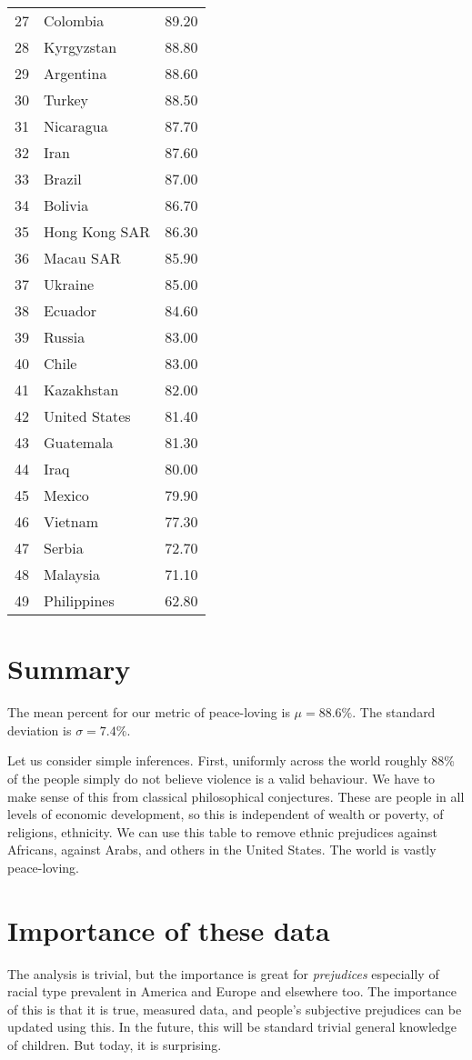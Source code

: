 \documentclass{amsart}
\begin{document}
\begin{longtable}{rlr}
  27 & Colombia & 89.20 \\ 
  28 & Kyrgyzstan & 88.80 \\ 
  29 & Argentina & 88.60 \\ 
  30 & Turkey & 88.50 \\ 
  31 & Nicaragua & 87.70 \\ 
  32 & Iran & 87.60 \\ 
  33 & Brazil & 87.00 \\ 
  34 & Bolivia & 86.70 \\ 
  35 & Hong Kong SAR & 86.30 \\ 
  36 & Macau SAR & 85.90 \\ 
  37 & Ukraine & 85.00 \\ 
  38 & Ecuador & 84.60 \\ 
  39 & Russia & 83.00 \\ 
  40 & Chile & 83.00 \\ 
  41 & Kazakhstan & 82.00 \\ 
  42 & United States & 81.40 \\ 
  43 & Guatemala & 81.30 \\ 
  44 & Iraq & 80.00 \\ 
  45 & Mexico & 79.90 \\ 
  46 & Vietnam & 77.30 \\ 
  47 & Serbia & 72.70 \\ 
  48 & Malaysia & 71.10 \\ 
  49 & Philippines & 62.80 \\ 
   \hline
\hline
\end{longtable}

\section{Summary}

The mean percent for our metric of peace-loving is $\mu = 88.6\%$.  The standard deviation is $\sigma = 7.4\%$.  

Let us consider simple inferences.  First, uniformly across the world roughly 88\% of the people simply do not believe violence is a valid behaviour.  We have to make sense of this from classical philosophical conjectures.  These are people in all levels of economic development, so this is independent of wealth or poverty, of religions, ethnicity.  We can use this table to remove ethnic prejudices against Africans, against Arabs, and others in the United States.  The world is vastly peace-loving.  

\section{Importance of these data}

The analysis is trivial, but the importance is great for {\em prejudices} especially of racial type prevalent in America and Europe and elsewhere too.  The importance of this is that it is true, measured data, and people's subjective prejudices can be updated using this.  In the future, this will be standard trivial general knowledge of children.  But today, it is surprising.
\end{document}
